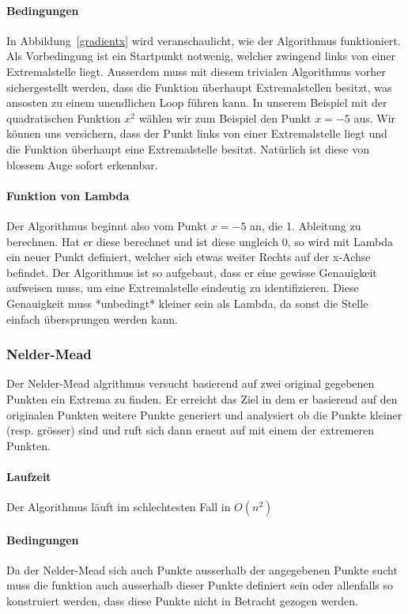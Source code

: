 \documentclass[10pt]{article}         %
\begin{document}
\paragraph{Bedingungen}
In Abbildung~\ref{gradientx} wird veranschaulicht, wie der Algorithmus funktioniert. Als Vorbedingung ist ein Startpunkt notwenig, welcher zwingend links von einer Extremalstelle liegt. Ausserdem muss mit diesem trivialen Algorithmus vorher sichergestellt werden, dass die Funktion überhaupt Extremalstellen besitzt, was ansosten zu einem unendlichen Loop führen kann. In unserem Beispiel mit der quadratischen Funktion $x^2$ wählen wir zum Beispiel den Punkt $x=-5$ aus. Wir können uns versichern, dass der Punkt links von einer Extremalstelle liegt und die Funktion überhaupt eine Extremalstelle besitzt. Natürlich ist diese von blossem Auge sofort erkennbar. 

\paragraph{Funktion von Lambda}
Der Algorithmus beginnt also vom Punkt $x=-5$ an, die 1. Ableitung zu berechnen. Hat er diese berechnet und ist diese ungleich 0, so wird mit Lambda ein neuer Punkt definiert, welcher sich etwas weiter Rechts auf der x-Achse befindet. Der Algorithmus ist so aufgebaut, dass er eine gewisse Genauigkeit aufweisen muss, um eine Extremalstelle eindeutig zu identifizieren. Diese Genauigkeit muss *unbedingt* kleiner sein als Lambda, da sonst die Stelle einfach übersprungen werden kann.

\subsubsection{Nelder-Mead}
Der Nelder-Mead algrithmus versucht basierend auf zwei original gegebenen Punkten ein Extrema zu finden. Er erreicht das Ziel in dem er basierend auf den originalen Punkten weitere Punkte generiert und analysiert ob die Punkte kleiner (resp. grösser) sind und ruft sich dann erneut auf mit einem der extremeren Punkten.

\paragraph{Laufzeit}
Der Algorithmus läuft im schlechtesten Fall in $O(n^2)$

\paragraph{Bedingungen}
Da der Nelder-Mead sich auch Punkte ausserhalb der angegebenen Punkte sucht muss die funktion auch ausserhalb dieser Punkte definiert sein oder allenfalls so konstruiert werden, dass diese Punkte nicht in Betracht gezogen werden.
\end{document}
